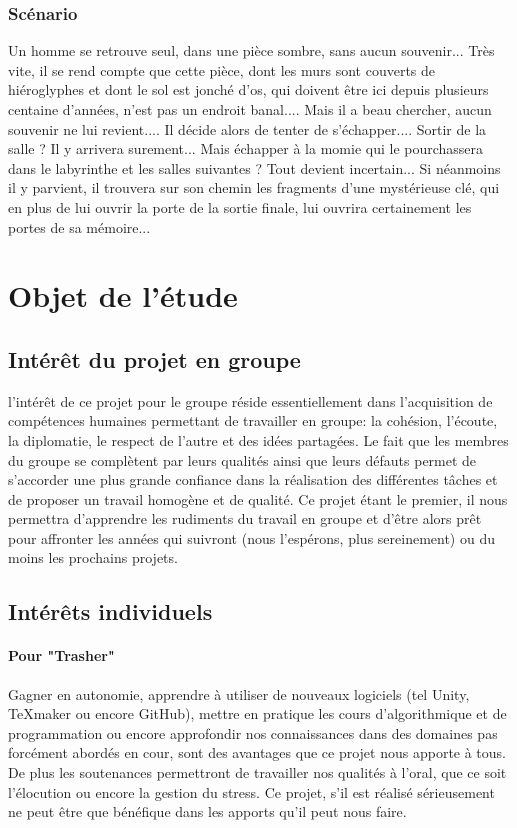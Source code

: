 \documentclass[12pt,a4paper]{article}
\begin{document}
\subsubsection{Scénario}
Un homme se retrouve seul, dans une pièce sombre, sans aucun souvenir...
Très vite, il se rend compte que cette pièce, dont les murs sont couverts de hiéroglyphes et dont le sol est jonché d'os, qui doivent être ici depuis plusieurs centaine d'années, n'est pas un endroit banal....
Mais il a beau chercher, aucun souvenir ne lui revient....
Il décide alors de tenter de s'échapper....
Sortir de la salle ? Il y arrivera surement... Mais échapper à la momie qui le pourchassera dans le labyrinthe et les salles suivantes ? Tout devient incertain...
Si néanmoins il y parvient, il trouvera sur son chemin les fragments d'une mystérieuse clé, qui en plus de lui ouvrir la porte de la sortie finale, lui ouvrira certainement les portes de sa mémoire...

\newpage
\section{Objet de l'étude}
\subsection{Intérêt du projet en groupe}
l'intérêt de ce projet pour le groupe réside essentiellement dans l'acquisition de compétences humaines
permettant de travailler en groupe: la cohésion, l'écoute, la diplomatie, le respect de l'autre et des idées partagées.
Le fait que les membres du groupe se complètent par leurs qualités ainsi que leurs défauts permet de s'accorder une plus grande confiance dans la réalisation des différentes tâches et de proposer un travail
homogène et de qualité.
Ce projet étant le premier, il nous permettra d'apprendre les rudiments du travail en groupe et d'être
alors prêt pour affronter les années qui suivront (nous l'espérons, plus sereinement) ou du moins les
prochains projets.

\subsection{Intérêts individuels}
\paragraph{Pour "Trasher"}
Gagner en autonomie, apprendre à utiliser de nouveaux logiciels (tel Unity, TeXmaker ou encore GitHub), mettre en pratique les cours d'algorithmique et de programmation ou encore approfondir nos connaissances dans des domaines pas forcément abordés en cour, sont des avantages que ce projet nous apporte à tous.
De plus les soutenances permettront de travailler nos qualités à l'oral, que ce soit l'élocution ou encore la gestion du stress. Ce projet, s'il est réalisé sérieusement ne peut être que bénéfique dans les apports qu'il peut nous faire.
\end{document}
